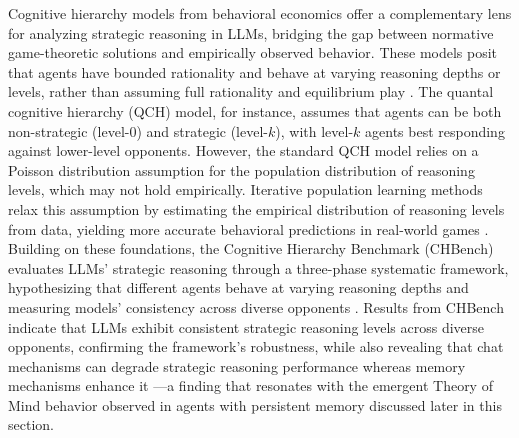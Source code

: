 \documentclass[11pt]{article}
\begin{document}
Cognitive hierarchy models from behavioral economics offer a complementary lens for analyzing strategic reasoning in LLMs, bridging the gap between normative game-theoretic solutions and empirically observed behavior. These models posit that agents have bounded rationality and behave at varying reasoning depths or levels, rather than assuming full rationality and equilibrium play \cite{ref217}. The quantal cognitive hierarchy (QCH) model, for instance, assumes that agents can be both non-strategic (level-0) and strategic (level-\(k\)), with level-\(k\) agents best responding against lower-level opponents. However, the standard QCH model relies on a Poisson distribution assumption for the population distribution of reasoning levels, which may not hold empirically. Iterative population learning methods relax this assumption by estimating the empirical distribution of reasoning levels from data, yielding more accurate behavioral predictions in real-world games \cite{ref217}. Building on these foundations, the Cognitive Hierarchy Benchmark (CHBench) evaluates LLMs' strategic reasoning through a three-phase systematic framework, hypothesizing that different agents behave at varying reasoning depths and measuring models' consistency across diverse opponents \cite{ref218}. Results from CHBench indicate that LLMs exhibit consistent strategic reasoning levels across diverse opponents, confirming the framework's robustness, while also revealing that chat mechanisms can degrade strategic reasoning performance whereas memory mechanisms enhance it \cite{ref218}---a finding that resonates with the emergent Theory of Mind behavior observed in agents with persistent memory discussed later in this section.
\end{document}

